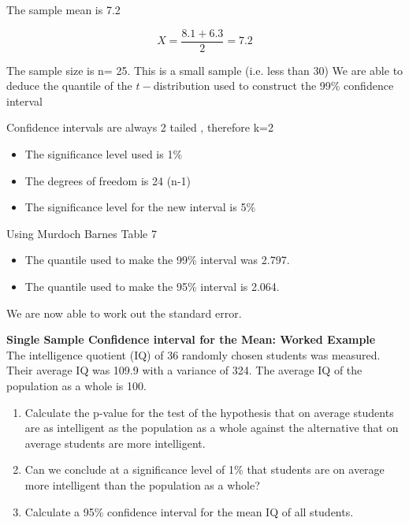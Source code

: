 	The sample mean is 7.2
	
	\[X=\frac{8.1 + 6.3}{2}=7.2\]
	
	The sample size is n= 25. This is a small sample (i.e. less than 30)
	We are able to deduce the quantile of the $t-$distribution used to construct the 99\% confidence interval
	
	Confidence intervals are always 2 tailed , therefore k=2
	\begin{itemize}
		\item The significance level used is 1\%
		\item The degrees of freedom  is 24 (n-1)
		\item The significance level for the new interval is 5\%
	\end{itemize}
	Using Murdoch Barnes Table 7
	\begin{itemize}
		\item The quantile used to make the 99\% interval was 2.797.
		\item The quantile used to make the 95\% interval is 2.064.
	\end{itemize}
	We are now able to work out the standard error.
	
	
	\item \textbf{Single Sample Confidence interval for the Mean: Worked Example}\\
	
	The intelligence quotient (IQ) of 36 randomly chosen students was measured.
	Their average IQ was 109.9 with a variance of 324.
	The average IQ of the population as a whole is 100.
	
	\begin{enumerate}
		\item Calculate the p-value for the test of the hypothesis that on average
		students are as intelligent as the population as a whole against the alternative that on average students are more intelligent.
		
		
		\item Can we conclude at a significance level of 1\% that students are on average more intelligent than the population as a whole?
		
		\item Calculate a 95\% confidence interval for the mean IQ of all students.
		
	\end{enumerate}
	
